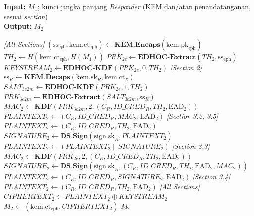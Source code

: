 \documentclass{easychair}
\begin{document}
\begin{algorithm}[H]
\caption{Step 2 (\emph{Responder}) --- Memproses $M_1$ dan menyiapkan $M_2$}
\label{alg:step2}
\textbf{Input:} $M_1$; kunci jangka panjang \emph{Responder} (KEM dan/atau penandatanganan, sesuai \emph{section}) \\
\textbf{Output:} $M_2$
\begin{algorithmic}[1]
\Statex \textit{[All Sections]}
\State $(\mathrm{ss}_{\mathrm{eph}}, \mathrm{kem.ct}_{\mathrm{eph}}) \gets \mathbf{KEM.Encaps}(\mathrm{kem.pk}_{\mathrm{eph}})$
\State $TH_2 \gets H(\mathrm{kem.ct}_{\mathrm{eph}}, H(M_1))$
\State $PRK_{2e} \gets \mathbf{EDHOC\text{-}Extract}(TH_2, \mathrm{ss}_{\mathrm{eph}})$
\State $KEYSTREAM_2 \gets \mathbf{EDHOC\text{-}KDF}(PRK_{2e}, 0, TH_2)$
\Statex \textit{[Section 2]} 
\State $\mathrm{ss}_R \gets \mathbf{KEM.Decaps}(\mathrm{kem.sk}_R, \mathrm{kem.ct}_R)$
\State $SALT_{3e2m} \gets \mathbf{EDHOC\text{-}KDF}(PRK_{2e}, 1, TH_2)$
\State $PRK_{3e2m} \gets \mathbf{EDHOC\text{-}Extract}(SALT_{3e2m}, \mathrm{ss}_R)$
\State $MAC_2 \gets \mathbf{KDF}(PRK_{3e2m}, 2, (C_R, ID\_CRED_R, TH_2, \mathrm{EAD}_2))$
\State $PLAINTEXT_2 \gets (C_R, ID\_CRED_R, MAC_2, \mathrm{EAD}_2)$
\Statex \textit{[Section 3.2, 3.5]} 
\State $PLAINTEXT_2 \gets (C_R, ID\_CRED_R, TH_2, \mathrm{EAD}_2)$
\State $SIGNATURE_2 \gets \mathbf{DS.Sign}(\mathrm{sign.sk}_R, PLAINTEXT_2)$
\State $PLAINTEXT_2 \gets (PLAINTEXT_2 \parallel SIGNATURE_2)$
\Statex \textit{[Section 3.3]} 
\State $MAC_2 \gets \mathbf{KDF}(PRK_{2e}, 2, (C_R, ID\_CRED_R, TH_2, \mathrm{EAD}_2))$
\State $SIGNATURE_2 \gets \mathbf{DS.Sign}(\mathrm{sign.sk}_R, (C_R, ID\_CRED_R, TH_2, \mathrm{EAD}_2, MAC_2))$
\State $PLAINTEXT_2 \gets (C_R, ID\_CRED_R, SIGNATURE_2, \mathrm{EAD}_2)$
\Statex \textit{[Section 3.4]} 
\State $PLAINTEXT_2 \gets (C_R, ID\_CRED_R, TH_2, \mathrm{EAD}_2)$
\Statex \textit{[All Sections]}
\State $CIPHERTEXT_2 \gets PLAINTEXT_2 \oplus KEYSTREAM_2$
\State $M_2 \gets (\mathrm{kem.ct}_{\mathrm{eph}}, CIPHERTEXT_2)$
\State \Return $M_2$
\end{algorithmic}
\end{algorithm}
\end{document}
